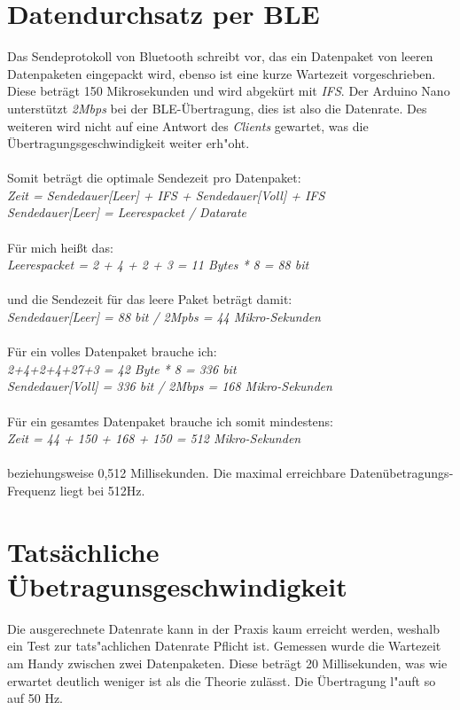 \section{Datendurchsatz per BLE}

Das Sendeprotokoll von Bluetooth schreibt vor, das ein Datenpaket von
leeren Datenpaketen eingepackt wird, ebenso ist eine kurze Wartezeit vorgeschrieben. 
Diese beträgt 150 Mikrosekunden und wird abgekürt mit \textit{IFS}.
Der Arduino Nano unterstützt \textit{2Mbps} bei der BLE-Übertragung, dies ist also die Datenrate.
Des weiteren wird nicht auf eine Antwort des \textit{Clients} gewartet, was die 
Übertragungsgeschwindigkeit weiter erh"oht.\\
\\
Somit beträgt die optimale Sendezeit pro Datenpaket:\\
\textit{Zeit = Sendedauer[Leer] + IFS + Sendedauer[Voll] + IFS\\
Sendedauer[Leer] = Leerespacket / Datarate}\\
\\
Für mich heißt das:\\
\textit{Leerespacket = 2 + 4 + 2 + 3 = 11 Bytes * 8 = 88 bit}\\
\\
und die Sendezeit für das leere Paket beträgt damit:\\
\textit{Sendedauer[Leer] = 88 bit / 2Mpbs = 44 Mikro-Sekunden}\\
\\
Für ein volles Datenpaket brauche ich:\\
\textit{2+4+2+4+27+3 = 42 Byte * 8 = 336 bit\\
Sendedauer[Voll] = 336 bit / 2Mbps = 168 Mikro-Sekunden}\\
\\
Für ein gesamtes Datenpaket brauche ich somit mindestens:\\
\textit{Zeit = 44 + 150 + 168 + 150 = 512 Mikro-Sekunden}\\
\\
beziehungsweise 0,512 Millisekunden. Die maximal erreichbare Datenübetragungs-Frequenz
liegt bei 512Hz.


\section{Tatsächliche Übetragunsgeschwindigkeit}
Die ausgerechnete Datenrate kann in der Praxis kaum erreicht werden, weshalb ein Test zur 
tats"achlichen Datenrate Pflicht ist. Gemessen wurde die Wartezeit am Handy zwischen zwei
Datenpaketen. Diese beträgt 20 Millisekunden, was wie erwartet deutlich weniger ist als die
Theorie zulässt. Die Übertragung l"auft so auf 50 Hz.
